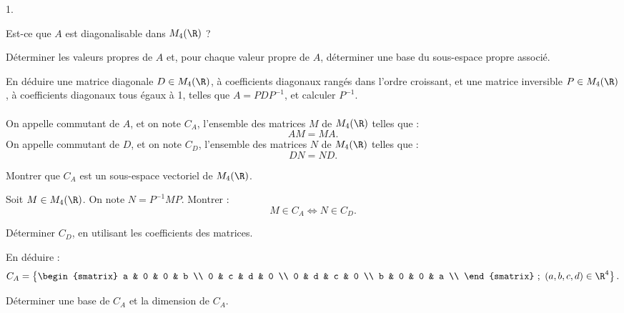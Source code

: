 \documentclass[11pt]{article}%
\begin{document}
\begin{noliste}{1.}
 \setlength{\itemsep}{4mm}

\item Est-ce que $A$ est diagonalisable dans $M_{4} (\R)$ ? \\

\item Déterminer les valeurs propres de $A$ et, pour chaque valeur
propre de $A$, déterminer une base du sous-espace propre associé. \\

\item En déduire une matrice diagonale $D \in M_{4} (\R)$, à
coefficients diagonaux rangés dans l'ordre croissant, et une matrice
inversible $P \in M_{4} (\R)$, à coefficients diagonaux tous égaux à 1,
telles que $A = P D P^{-1}$, et calculer $P^{-1}$. \\
\\

On appelle commutant de $A$, et on note $C_{A}$, l'ensemble des
matrices $M$ de $M_{4}(\R)$ telles que : 
\[
AM = MA.
\]
On appelle commutant de $D$, et on note $C_{D}$, l'ensemble des
matrices $N$ de $M_{4}(\R)$ telles que : 
\[
DN = ND.
\]

\item Montrer que $C_{A}$ est un sous-espace vectoriel de $M_{4} (\R)$.
\\

\item Soit $M \in M_{4} (\R)$. On note $N = P^{-1} M P$. Montrer : 
\[
 M \in C_{A} \Longleftrightarrow N \in C_{D}. 
\]

\item Déterminer $C_{D}$, en utilisant les coefficients des matrices.
\\

\item En déduire : 
\[
 C_{A} = \left\{ \begin{smatrix}
a & 0 & 0 & b \\
0 & c & d & 0 \\
0 & d & c & 0 \\
b & 0 & 0 & a \\
\end{smatrix}
\ ; \ (a,b,c,d) \in \R^{4} \right\}. 
\]

\item Déterminer une base de $C_{A}$ et la dimension de $C_{A}$.

\end{noliste}
\end{document}
